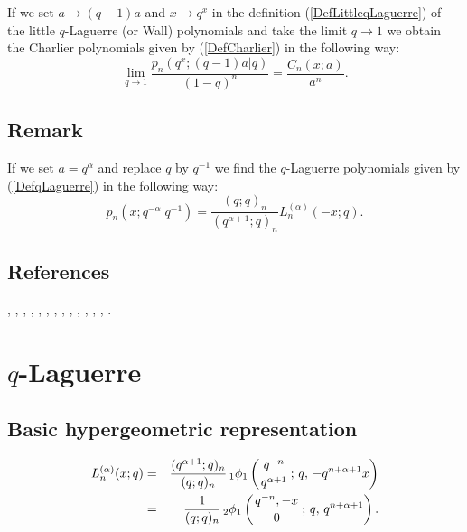 \documentclass[envcountchap,graybox]{svmono}
\newcommand{\qhyp}[5]{\mbox{}_{#1}{\phi}_{#2}
\left(\genfrac{}{}{0pt}{}{#3}{#4}\,;\,q,\,#5\right)}
\begin{document}
If we set $a\rightarrow (q-1)a$ and $x\rightarrow q^x$ in the definition (\ref{DefLittleqLaguerre})
of the little $q$-Laguerre (or Wall) polynomials and take the limit $q\rightarrow 1$ we obtain
the Charlier polynomials given by (\ref{DefCharlier}) in the following way:
\begin{equation}
\lim_{q\rightarrow 1}\frac{p_n(q^x;(q-1)a|q)}{(1-q)^n}=
\frac{C_n(x;a)}{a^n}.
\end{equation}

\subsection*{Remark} If we set $a=q^{\alpha}$ and replace $q$ by $q^{-1}$ we find the
$q$-Laguerre polynomials given by (\ref{DefqLaguerre}) in the following
way:
$$p_n(x;q^{-\alpha}|q^{-1})=\frac{(q;q)_n}{(q^{\alpha+1};q)_n}L_n^{(\alpha)}(-x;q).$$

\subsection*{References}
\cite{AlSalam90}, \cite{AlSalamVerma82I}, \cite{AtakAtakI},
\cite{Chihara68II}, \cite{Chihara78}, \cite{Chihara79}, \cite{DattaGriffin},
\cite{FlorisKoelink}, \cite{GasperRahman90}, \cite{Koorn90II}, \cite{Koorn91},
\cite{Nikiforov+}, \cite{VanAsscheKoorn}, \cite{Wall}.


\section{$q$-Laguerre}
\par\setcounter{equation}{0}

\subsection*{Basic hypergeometric representation}
\begin{eqnarray}
\label{DefqLaguerre}
L_n^{(\alpha)}(x;q)&=&\frac{(q^{\alpha+1};q)_n}{(q;q)_n}\,
\qhyp{1}{1}{q^{-n}}{q^{\alpha+1}}{-q^{n+\alpha+1}x}\\
&=&\frac{1}{(q;q)_n}\,\qhyp{2}{1}{q^{-n},-x}{0}{q^{n+\alpha+1}}.\nonumber
\end{eqnarray}
\end{document}

